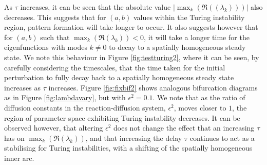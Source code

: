 As $\tau$ increases, it can be seen that the absolute value $|\max_k(\Re((\lambda_k)))|$ also decreases. This suggests that for $(a,b)$ values within the Turing instability region, pattern formation will take longer to occur. It also suggests however that for $(a,b)$ such that $\max_k(\Re(\lambda_k))<0$, it will take a longer time for the eigenfunctions with modes $k\neq0$ to decay to a spatially homogeneous steady state. We note this behaviour in Figure \ref{fig:testturing2}, where it can be seen, by carefully considering the timescales, that the time taken for the initial perturbation to fully decay back to a spatially homogeneous steady state increases as $\tau$ increases. Figure \ref{fig:fixbif2} shows analogous bifurcation diagrams as in Figure \ref{fig:lambdavary}, but with $\epsilon^2=0.1$. We note that as the ratio of diffusion constants in the reaction-diffusion system, $\epsilon^2$, moves closer to $1$, the region of parameter space exhibiting Turing instability decreases. It can be observed however, that altering $\epsilon^2$ does not change the effect that an increasing $\tau$ has on $\max_k(\Re(\lambda_k))$, and that increasing the delay $\tau$ continues to act as a stabilising  for Turing instabilities, with a shifting of the spatially homogeneous inner arc.

